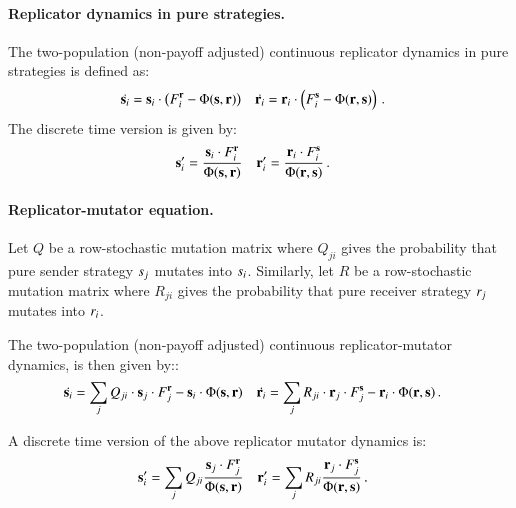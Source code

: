 \paragraph{Replicator dynamics in pure strategies.} The two-population
(non-payoff adjusted) continuous replicator dynamics in pure
strategies is defined as:
\begin{align*}
  \dot{\mathrm{\mathbf{s}}_i} & = \mathrm{\mathbf{s}}_i \cdot \left ( F_i^{\mathrm{\mathbf{r}}} -
  \Phi(\mathrm{\mathbf{s}},\mathrm{\mathbf{r}}) \right ) &   \dot{\mathrm{\mathbf{r}}_i} &  = \mathrm{\mathbf{r}}_i \cdot \left ( F_i^{\mathrm{\mathbf{s}}} -
  \Phi(\mathrm{\mathbf{r}},\mathrm{\mathbf{s}}) \right ) \,.
\end{align*}
The discrete time version is given by: 
\begin{align*}
  \mathrm{\mathbf{s}}_i' & = \frac{\mathrm{\mathbf{s}}_i \cdot
  F_i^{\mathrm{\mathbf{r}}}}{ \Phi(\mathrm{\mathbf{s}},\mathrm{\mathbf{r}})} &     \mathrm{\mathbf{r}}_i' & = \frac{\mathrm{\mathbf{r}}_i \cdot
  F_i^{\mathrm{\mathbf{s}}}}{ \Phi(\mathrm{\mathbf{r}},\mathrm{\mathbf{s}})} \,.
\end{align*}


\paragraph{Replicator-mutator equation.} Let $Q$ be a row-stochastic
mutation matrix where $Q_{ji}$ gives the probability that pure sender
strategy $s_j$ mutates into $s_i$. Similarly, let $R$ be a
row-stochastic mutation matrix where $R_{ji}$ gives the probability
that pure receiver strategy $r_j$ mutates into $r_i$.

The two-population (non-payoff adjusted) continuous replicator-mutator
dynamics, is then given by::
\begin{align*}
  \dot{\mathrm{\mathbf{s}}_i} & = \sum_{j}  Q_{ji} \cdot \mathrm{\mathbf{s}}_j
    \cdot F_j^{\mathrm{\mathbf{r}}} - \mathrm{\mathbf{s}}_i \cdot \Phi(\mathrm{\mathbf{s}},\mathrm{\mathbf{r}}) &
    \dot{\mathrm{\mathbf{r}}_i} & = \sum_{j}  R_{ji} \cdot \mathrm{\mathbf{r}}_j
    \cdot F_j^{\mathrm{\mathbf{s}}} - \mathrm{\mathbf{r}}_i \cdot \Phi(\mathrm{\mathbf{r}},\mathrm{\mathbf{s}}) \,.
\end{align*}
\begin{claim} A discrete time version of the above replicator mutator
  dynamics is:
  \begin{align*}
    \mathrm{\mathbf{s}}_i' & = \sum_{j} Q_{ji} \frac{\mathrm{\mathbf{s}}_j \cdot
      F_j^{\mathrm{\mathbf{r}}}}{ \Phi(\mathrm{\mathbf{s}},\mathrm{\mathbf{r}})} & \mathrm{\mathbf{r}}_i' & = \sum_{j}
    R_{ji} \frac{\mathrm{\mathbf{r}}_j \cdot F_j^{\mathrm{\mathbf{s}}}}{
      \Phi(\mathrm{\mathbf{r}},\mathrm{\mathbf{s}})}\,.
  \end{align*}
\end{claim}

